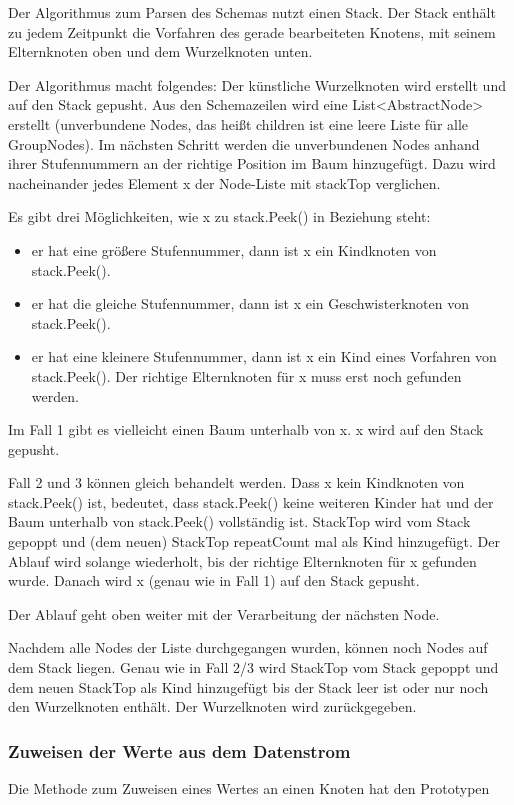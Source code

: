 Der Algorithmus zum Parsen des Schemas nutzt einen Stack. Der Stack enthält zu jedem Zeitpunkt die Vorfahren des gerade bearbeiteten Knotens, mit seinem Elternknoten oben und dem Wurzelknoten unten.

Der Algorithmus macht folgendes:
Der künstliche Wurzelknoten wird erstellt und auf den Stack gepusht.
Aus den Schemazeilen wird eine List<AbstractNode> erstellt (unverbundene Nodes, das heißt children ist eine leere Liste für alle GroupNodes).
Im nächsten Schritt werden die unverbundenen Nodes anhand ihrer Stufennummern an der richtige Position im Baum hinzugefügt.
Dazu wird nacheinander jedes Element x der Node-Liste mit stackTop verglichen.

Es gibt drei Möglichkeiten, wie x zu stack.Peek() in Beziehung steht:
\begin{itemize}
\item er hat eine größere Stufennummer, dann ist x ein Kindknoten von stack.Peek().
\item er hat die gleiche Stufennummer, dann ist x ein Geschwisterknoten von stack.Peek().
\item er hat eine kleinere Stufennummer, dann ist x ein Kind eines Vorfahren von stack.Peek(). Der richtige Elternknoten für x muss erst noch gefunden werden.
\end{itemize}

Im Fall 1 gibt es vielleicht einen Baum unterhalb von x. x wird auf den Stack gepusht.

Fall 2 und 3 können gleich behandelt werden. Dass x kein Kindknoten von stack.Peek() ist, bedeutet, dass stack.Peek() keine weiteren Kinder hat und der Baum unterhalb von stack.Peek() vollständig ist. StackTop wird vom Stack gepoppt und (dem neuen) StackTop repeatCount mal als Kind hinzugefügt. Der Ablauf wird solange wiederholt, bis der richtige Elternknoten für x gefunden wurde.
Danach wird x (genau wie in Fall 1) auf den Stack gepusht.

Der Ablauf geht oben weiter mit der Verarbeitung der nächsten Node.

Nachdem alle Nodes der Liste durchgegangen wurden, können noch Nodes auf dem Stack liegen. Genau wie in Fall 2/3 wird StackTop vom Stack gepoppt und dem neuen StackTop als Kind hinzugefügt bis der Stack leer ist oder nur noch den Wurzelknoten enthält. Der Wurzelknoten wird zurückgegeben.


\subsubsection{Zuweisen der Werte aus dem Datenstrom}
Die Methode zum Zuweisen eines Wertes an einen Knoten hat den Prototypen 

